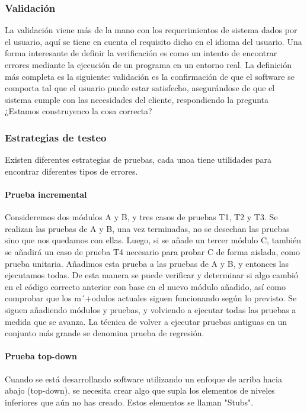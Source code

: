 \subsubsection{Validación} La validación viene más de la mano con los requerimientos de sistema dados por el usuario, aquí se tiene en cuenta el requisito dicho en el idioma del usuario. Una forma interesante de definir la verificación es como un intento de encontrar errores mediante la ejecución de un programa en un entorno real. La definición más completa es la siguiente: validación es la confirmación de que el software se comporta tal que el usuario puede estar satisfecho, asegurándose de que el sistema cumple con las necesidades del cliente, respondiendo la pregunta ¿Estamos construyenco la cosa correcta?

\subsubsection{Estrategias de testeo} Existen diferentes estrategias de pruebas, cada unoa tiene utilidades para encontrar diferentes tipos de errores. 

\paragraph{Prueba incremental} Consideremos dos módulos A y B, y tres casos de pruebas T1, T2 y T3. Se realizan las pruebas de A y B, una vez terminadas, no se desechan las pruebas sino que nos quedamos con ellas. Luego, si se añade un tercer módulo C, también se añadirá un caso de prueba T4 necesario para probar C de forma aislada, como prueba unitaria. Añadimos esta prueba a las pruebas de A y B, y entonces las ejecutamos todas. De esta manera se puede verificar y determinar si algo cambió en el código correcto anterior con base en el nuevo módulo añadido, así como comprobar que los m´+odulos actuales siguen funcionando según lo previsto. Se siguen añadiendo módulos y pruebas, y volviendo a ejecutar todas las pruebas a medida que se avanza. La técnica de volver a ejecutar pruebas antiguas en un conjunto más grande se denomina prueba de regresión. 

\paragraph{Prueba top-down} Cuando se está desarrollando software utilizando un enfoque de arriba hacia abajo (top-down), se necesita crear algo que supla los elementos de niveles inferiores que aún no has creado. Estos elementos se llaman "Stubs". 

